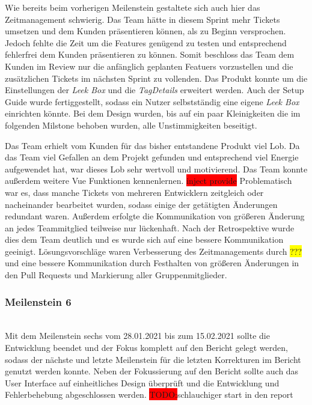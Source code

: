 \documentclass[10pt, a4paper]{article}
\begin{document}
Wie bereits beim vorherigen Meilenstein gestaltete sich auch hier das Zeitmanagement schwierig.
Das Team hätte in diesem Sprint mehr Tickets umsetzen und dem Kunden präsentieren können, als zu Beginn versprochen. Jedoch fehlte die Zeit um die Features genügend zu testen und entsprechend fehlerfrei dem Kunden präsentieren zu können.
Somit beschloss das Team dem Kunden im Review nur die anfänglich geplanten Featuers vorzustellen und die zusätzlichen Tickets im nächsten Sprint zu vollenden.
Das Produkt konnte um die Einstellungen der \textit{Leek Box} und die \textit{TagDetails}  erweitert werden.
Auch der Setup Guide wurde fertiggestellt, sodass ein Nutzer selbstständig eine eigene \textit{Leek Box} einrichten könnte.
Bei dem Design wurden, bis auf ein paar Kleinigkeiten die im folgenden Milstone behoben wurden, alle Unstimmigkeiten beseitigt.

Das Team erhielt vom Kunden für das bisher entstandene Produkt viel Lob.
Da das Team viel Gefallen an dem Projekt gefunden und entsprechend viel Energie aufgewendet hat, war dieses Lob sehr wertvoll und motivierend.
Das Team konnte außerdem weitere Vue Funktionen kennenlernen.
\colorbox{red}{inject provide}
Problematisch war es, dass manche Tickets von mehreren Entwicklern zeitgleich oder nacheinander bearbeitet wurden, sodass einige der getätigten Änderungen redundant waren.
Außerdem erfolgte die Kommunikation von größeren Änderung an jedes Teammitglied teilweise nur lückenhaft.
Nach der Retrospektive wurde dies dem Team deutlich und es wurde sich auf eine bessere Kommunikation geeinigt.
Lösungsvorschläge waren Verbesserung des Zeitmanagements durch \colorbox{yellow}{???} und eine bessere Kommunikation durch Festhalten von größeren Änderungen in den Pull Requests und Markierung aller Gruppenmitglieder.

\subsubsection*{Meilenstein 6} $~$ \\
Mit dem Meilenstein sechs vom 28.01.2021 bis zum 15.02.2021 sollte die Entwicklung beendet und der Fokus komplett auf den Bericht gelegt werden, sodass der nächste und letzte Meilenstein für die letzten Korrekturen im Bericht genutzt werden konnte.
Neben der Fokussierung auf den Bericht sollte auch das User Interface auf einheitliches Design überprüft und die Entwicklung und Fehlerbehebung abgeschlossen werden.
\colorbox{red}{TODO:}schlauchiger start in den report
\end{document}
